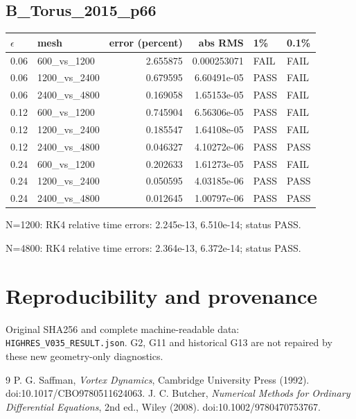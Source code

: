 \documentclass[10pt,a4paper]{article}
\begin{document}
\subsection*{B\_Torus\_2015\_p66}
\begin{longtable}{@{}llrrll@{}}\toprule $\epsilon$ & mesh & error (percent) & abs RMS & 1\% & 0.1\%\\\midrule
0.06 & 600\_vs\_1200 & 2.655875 & 0.000253071 & FAIL & FAIL\\
0.06 & 1200\_vs\_2400 & 0.679595 & 6.60491e-05 & PASS & FAIL\\
0.06 & 2400\_vs\_4800 & 0.169058 & 1.65153e-05 & PASS & FAIL\\
0.12 & 600\_vs\_1200 & 0.745904 & 6.56306e-05 & PASS & FAIL\\
0.12 & 1200\_vs\_2400 & 0.185547 & 1.64108e-05 & PASS & FAIL\\
0.12 & 2400\_vs\_4800 & 0.046327 & 4.10272e-06 & PASS & PASS\\
0.24 & 600\_vs\_1200 & 0.202633 & 1.61273e-05 & PASS & FAIL\\
0.24 & 1200\_vs\_2400 & 0.050595 & 4.03185e-06 & PASS & PASS\\
0.24 & 2400\_vs\_4800 & 0.012645 & 1.00797e-06 & PASS & PASS\\
\bottomrule\end{longtable}
\par N=1200: RK4 relative time errors: 2.245e-13, 6.510e-14; status PASS.
\par N=4800: RK4 relative time errors: 2.364e-13, 6.372e-14; status PASS.
\section*{Reproducibility and provenance}
Original SHA256 and complete machine-readable data: \nolinkurl{HIGHRES_V035_RESULT.json}.
G2, G11 and historical G13 are not repaired by these new geometry-only diagnostics.
\begin{thebibliography}{9}
 P. G. Saffman, \emph{Vortex Dynamics}, Cambridge University Press (1992). doi:10.1017/CBO9780511624063.
 J. C. Butcher, \emph{Numerical Methods for Ordinary Differential Equations}, 2nd ed., Wiley (2008). doi:10.1002/9780470753767.
\end{thebibliography}
\end{document}
